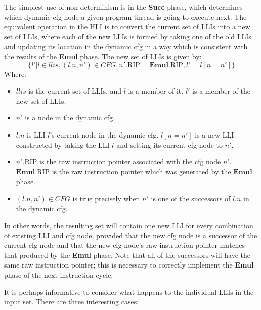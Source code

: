 The simplest use of non-determinism is in the \textbf{Succ} phase,
which determines which dynamic \gls{cfg} node a given program thread
is going to execute next.  The equivalent operation in the HLI is to
convert the current set of LLIs into a new set of LLIs, where each of
the new LLIs is formed by taking one of the old LLIs and updating its
location in the dynamic \gls{cfg} in a way which is consistent with
the results of the \textbf{Emul} phase.  The new set of LLIs is given
by:
\begin{displaymath}
\{l' | l \in \mathit{llis}, (l.n, n') \in \mathit{CFG}, n'.\mathrm{RIP} = \mathbf{Emul}.\mathrm{RIP}, l' = l[n = n'] \}
\end{displaymath}
Where:
\begin{itemize}
\item $\mathit{llis}$ is the current set of LLIs, and $l$ is a member of it.
  $l'$ is a member of the new set of LLIs.
\item $n'$ is a node in the dynamic \gls{cfg}.
\item $l.n$ is LLI $l$'s current node in the dynamic \gls{cfg}.  $l[n =
  n']$ is a new LLI constructed by taking the LLI $l$ and setting its
  current \gls{cfg} node to $n'$.
\item $n'.\mathrm{RIP}$ is the raw instruction pointer associated with
  the \gls{cfg} node $n'$.  $\mathbf{Emul}.\mathrm{RIP}$ is the raw
  instruction pointer which was generated by the $\mathbf{Emul}$
  phase.
\item $(l.n, n') \in \mathit{CFG}$ is true precisely when $n'$ is one
  of the successors of $l.n$ in the dynamic \gls{cfg}.
\end{itemize}
In other words, the resulting set will contain one new LLI for every
combination of existing LLI and \gls{cfg} node, provided that the new
\gls{cfg} node is a successor of the current \gls{cfg} node and that
the new \gls{cfg} node's raw instruction pointer matches that produced
by the \textbf{Emul} phase.  Note that all of the successors will have
the same raw instruction pointer; this is necessary to correctly
implement the \textbf{Emul} phase of the next instruction cycle.

It is perhaps informative to consider what happens to the individual
LLIs in the input set.  There are three interesting cases:

